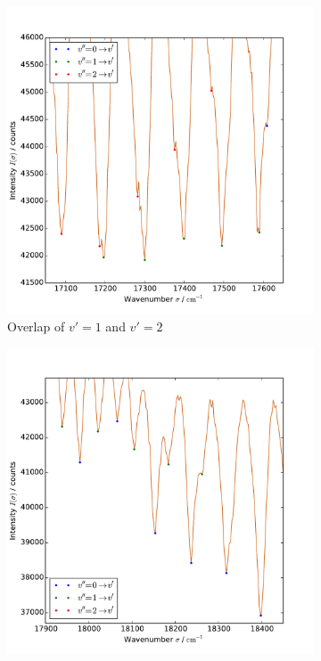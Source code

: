 \begin{figure}
    \centering
    \begin{subfigure}[b]{\picwidth}
        \includegraphics[width=\pltw]{analysis/figures/absorp_03_detail_01.pdf}
        \caption{Overlap of $v'=1$ and $v'=2$}
        \label{fig:absorp_detail_01}
    \end{subfigure}\qquad
    \begin{subfigure}[b]{\picwidth}
        \includegraphics[width=\pltw]{analysis/figures/absorp_03_detail_02.pdf}

\end{subfigure}
\end{figure}
